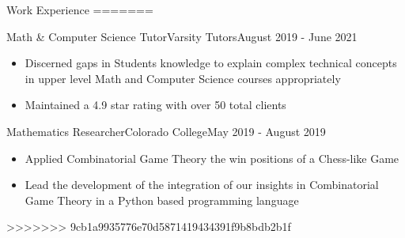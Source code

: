\begin{cvsection}{Work Experience}
=======
	\begin{cvsubsection}{Math \& Computer Science Tutor}{Varsity Tutors}{August 2019 - June 2021}	
		\begin{itemize}
			\item Discerned gaps in Students knowledge to explain complex technical concepts in upper level Math and Computer Science courses appropriately
			\item Maintained a 4.9 star rating with over 50 total clients
		\end{itemize}
	\end{cvsubsection}
	
	\begin{cvsubsection}{Mathematics Researcher}{Colorado College}{May 2019 - August 2019}
	\begin{itemize}
		\item Applied Combinatorial Game Theory the win positions of a Chess-like Game
		\item Lead the development of the integration of our insights in Combinatorial Game Theory in a Python based programming language
		\end{itemize}
	\end{cvsubsection}
>>>>>>> 9cb1a9935776e70d5871419434391f9b8bdb2b1f
\end{cvsection}



